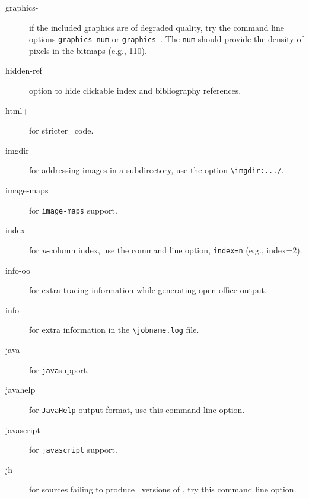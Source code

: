 \begin{description}
\item[graphics-] if the included graphics are of degraded quality, try
  the command line options \verb=graphics-num= or \verb=graphics-=.
  The \verb=num= should provide the density of pixels in the bitmaps
  (e.g., 110).


\item[hidden-ref] option to hide clickable index and bibliography
  references.


\item[html+] for stricter \HTML\ code.


\item[imgdir] for addressing images in a subdirectory, use the option
  \verb=\imgdir:.../=.

\item[image-maps] for \verb=image-maps= support.

\item[index] for \emph{n}-column index, use the command line option,
  \verb+index=n+ (e.g., index=2).

\item[info-oo] for extra tracing information while generating open
  office output.

\item[info] for extra information in the \verb=\jobname.log= file.

\item[java] for \verb=java=support.

\item[javahelp] for \verb=JavaHelp= output format, use this command
  line option.

\item[javascript] for \verb=javascript= support.

\item[jh-] for sources failing to produce \xml\ versions of \HTML, try
  this command line option.


\end{description}
